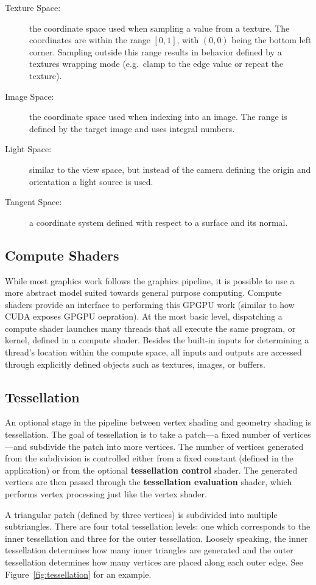 \begin{description}
    \item[Texture Space:] the coordinate space used when sampling a value from a texture. The coordinates are within the range $[0, 1]$, with $(0, 0)$ being the bottom left corner. Sampling outside this range results in behavior defined by a textures wrapping mode (e.g.\ clamp to the edge value or repeat the texture).
    \item[Image Space:] the coordinate space used when indexing into an image. The range is defined by the target image and uses integral numbers.
    \item[Light Space:] similar to the view space, but instead of the camera defining the origin and orientation a light source is used.
    \item[Tangent Space:] a coordinate system defined with respect to a surface and its normal.
\end{description}

\subsection{Compute Shaders}
While most graphics work follows the graphics pipeline, it is possible to use a more abstract model suited towards general purpose computing. Compute shaders provide an interface to performing this GPGPU work (similar to how CUDA exposes GPGPU oepration). At the most basic level, dispatching a compute shader launches many threads that all execute the same program, or kernel, defined in a compute shader. Besides the built-in inputs for determining a thread's location within the compute space, all inputs and outputs are accessed through explicitly defined objects such as textures, images, or buffers.

\subsection{Tessellation}
An optional stage in the pipeline between vertex shading and geometry shading is tessellation. The goal of tessellation is to take a patch---a fixed number of vertices---and subdivide the patch into more vertices. The number of vertices generated from the subdivision is controlled either from a fixed constant (defined in the application) or from the optional \textbf{tessellation control} shader. The generated vertices are then passed through the \textbf{tessellation evaluation} shader, which performs vertex processing just like the vertex shader.

A triangular patch (defined by three vertices) is subdivided into multiple subtriangles. There are four total tessellation levels: one which corresponds to the inner tessellation and three for the outer tessellation. Loosely speaking, the inner tessellation determines how many inner triangles are generated and the outer tessellation determines how many vertices are placed along each outer edge. See Figure~\ref{fig:tessellation} for an example.


